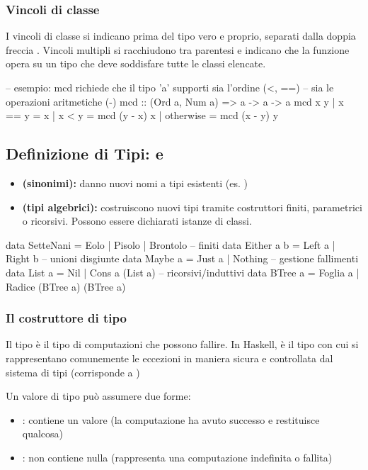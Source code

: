 \documentclass[a4paper,11pt]{report}
\begin{document}
\subsubsection{Vincoli di classe}
I vincoli di classe si indicano prima del tipo vero e proprio, separati dalla doppia freccia \code{=>}. Vincoli multipli si racchiudono tra parentesi e indicano che la funzione opera su un tipo che deve soddisfare tutte le classi elencate.

\begin{haskellbox}{}
-- esempio: mcd richiede che il tipo 'a' supporti sia l'ordine (<, ==) 
-- sia le operazioni aritmetiche (-)
mcd :: (Ord a, Num a) => a -> a -> a
mcd x y
  | x == y    = x
  | x < y     = mcd (y - x) x
  | otherwise = mcd (x - y) y
\end{haskellbox}

\subsection{Definizione di Tipi:  e }
\begin{itemize}
    \item \textbf{ (sinonimi):} danno nuovi nomi a tipi esistenti (es. )   
    \item \textbf{ (tipi algebrici):} costruiscono nuovi tipi tramite costruttori finiti, parametrici o ricorsivi. Possono essere dichiarati istanze di classi.
\end{itemize}

\begin{haskellbox}{}
data SetteNani = Eolo | Pisolo | Brontolo          -- finiti
data Either a b = Left a | Right b                 -- unioni disgiunte
data Maybe a = Just a | Nothing                    -- gestione fallimenti
data List a = Nil | Cons a (List a)                -- ricorsivi/induttivi
data BTree a = Foglia a | Radice (BTree a) (BTree a)
\end{haskellbox}
\subsubsection{Il costruttore di tipo }
Il tipo  è il tipo di computazioni che possono fallire. In Haskell, è il tipo con cui si rappresentano comunemente le eccezioni in maniera sicura e controllata dal sistema di tipi (corrisponde a )

Un valore di tipo  può assumere due forme:
\begin{itemize}
    \item {}: contiene un valore  (la computazione ha avuto successo e restituisce qualcosa)
    \item {}: non contiene nulla (rappresenta una computazione indefinita o fallita)
\end{itemize}
\end{document}
